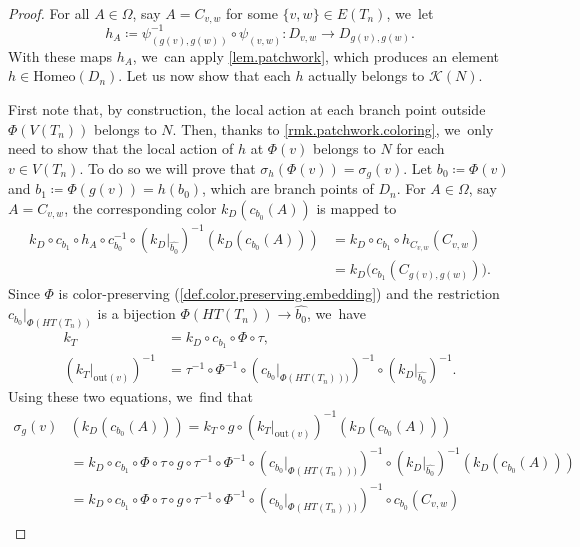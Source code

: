 \documentclass[JEP,XML,SOM,Unicode,NoFloatCountersInSection,published]{cedram}
\theoremstyle{plain}
\theoremstyle{definition}
\theoremstyle{remark}
\newcommand{\Homeo}{\mathrm{Homeo}}
\newcommand{\K}{\mathcal{K}}
\begin{document}
\begin{proof}
For all $A \in \Omega$, say $A=C_{v,w}$ for some $\{v,w\} \in E(T_n)$, we~let\vspace*{-3pt}
\[
h_A \coloneqq \psi_{\left(g(v),g(w)\right)}^{-1} \circ \psi_{(v,w)} \colon D_{v,w} \to D_{g(v),g(w)}.
\]
With these maps $h_A$, we~can apply \cref{lem.patchwork}, which produces an element $h \in \Homeo(D_n)$.
Let us now show that each $h$ actually belongs to $\K(N)$.

First note that, by construction, the local action at each branch point outside $\Phi(V(T_n))$ belongs to $N$.
Then, thanks to \cref{rmk.patchwork.coloring}, we~only need to show that the local action of $h$ at $\Phi(v)$ belongs to $N$ for each $v \in V(T_n)$.
To do so we will prove that $\sigma_h\left(\Phi(v)\right) = \sigma_g(v)$.
Let $b_0 \coloneqq \Phi(v)$ and $b_1 \coloneqq \Phi(g(v)) = h(b_0)$, which are branch points of $D_n$.
For $A \in \Omega$, say $A = C_{v,w}$, the corresponding color $k_D\left(c_{b_0}(A)\right)$ is mapped to
\begin{align*}
k_D \circ c_{b_1} \circ h_A \circ c_{b_0}^{-1} \circ (k_D|_{\widehat{b_0}})^{-1} \left(k_D\left(c_{b_0}(A)\right)\right) &=
k_D \circ c_{b_1} \circ h_{C_{v,w}} (C_{v,w})\\
&= k_D \bigl( c_{b_1}( C_{g(v),g(w)}) \bigr).
\end{align*}
Since $\Phi$ is color-preserving (\cref{def.color.preserving.embedding}) and the restriction $c_{b_0}|_{\Phi(HT(T_n))}$ is a bijection $\Phi(HT(T_n)) \to \widehat{b_0}$, we~have\vspace*{-3pt}
\begin{align*}
k_T &= k_D \circ c_{b_1} \circ \Phi \circ \tau,
\\
\left(k_T|_{\mathrm{out}(v)}\right)^{-1} &= \tau^{-1} \circ \Phi^{-1} \circ \left(c_{b_0}|_{\Phi(HT(T_n)))}\right)^{-1} \circ (k_D|_{\widehat{b_0}})^{-1}.
\end{align*}
Using these two equations, we~find that\vspace*{-3pt}
\begin{align*}
\sigma_g(v) &\left(k_D\left(c_{b_0}(A)\right)\right) = k_T \circ g \circ \left(k_T|_{\mathrm{out}(v)}\right)^{-1} \left(k_D\left(c_{b_0}(A)\right)\right)\\
& =
k_D \circ c_{b_1} \circ \Phi \circ \tau \circ g \circ \tau^{-1} \circ \Phi^{-1} \circ \left(c_{b_0}|_{\Phi(HT(T_n)))}\right)^{-1} \circ (k_D|_{\widehat{b_0}})^{-1} \left(k_D\left(c_{b_0}(A)\right)\right)\\
& =
k_D \circ c_{b_1} \circ \Phi \circ \tau \circ g \circ \tau^{-1} \circ \Phi^{-1} \circ \left(c_{b_0}|_{\Phi(HT(T_n)))}\right)^{-1} \circ c_{b_0} (C_{v,w})\\

\end{align*}
\end{proof}
\end{document}
